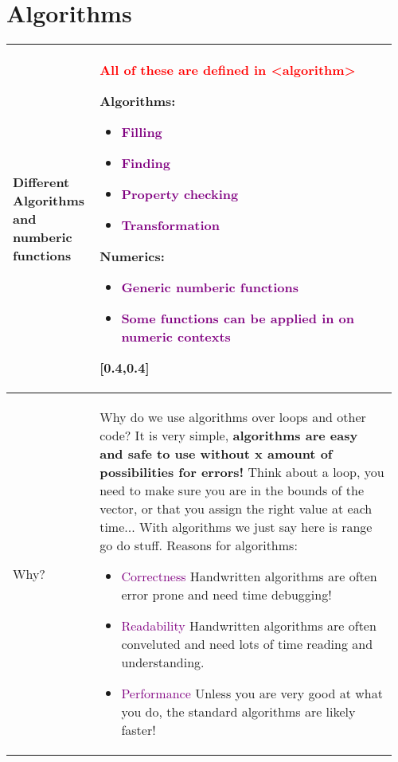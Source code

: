 \documentclass[main.tex,fontsize=8pt,paper=a4,paper=portrait,DIV=calc,]{scrartcl}
\begin{document}
\begin{table}[ht!]
\section{Algorithms}
\begin{tabular}{|m{0.2\linewidth}|m{0.755\linewidth}|}
\hline 
Different Algorithms and numberic functions & 
\textcolor{red}{All of these are defined in <algorithm>}\newline
\minipg{
Algorithms:\newline
\begin{itemize}
\item \textcolor{purple}{Filling}
\item \textcolor{purple}{Finding}
\item \textcolor{purple}{Property checking}
\item \textcolor{purple}{Transformation}
\end{itemize} 
}{
Numerics:\newline
\begin{itemize}
\item \textcolor{purple}{Generic numberic functions}
\item \textcolor{purple}{Some functions can be applied in on numeric contexts}
\end{itemize} 
}[0.4,0.4]\\
\hline
Why? & 
Why do we use algorithms over loops and other code?\newline
It is very simple, \textbf{algorithms are easy and safe to use without x amount of possibilities for errors!}\newline
Think about a loop, you need to make sure you are in the bounds of the vector, or that you assign the right value at each time...\newline
With algorithms we just say here is range go do stuff.
Reasons for algorithms:\newline
\begin{itemize}
\item \textcolor{purple}{Correctness}\newline
  Handwritten algorithms are often error prone and need time debugging!
\item \textcolor{purple}{Readability}\newline
  Handwritten algorithms are often conveluted and need lots of time reading and understanding.
\item \textcolor{purple}{Performance}\newline
  Unless you are very good at what you do, the standard algorithms are likely faster!

\end{itemize}
\end{tabular}
\end{table}
\end{document}
